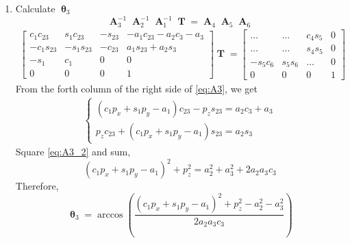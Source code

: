 \documentclass[12pt]{article}
\DeclareMathOperator{\A}{\mathbf{A}}
\DeclareMathOperator{\T}{\mathbf{T}}
\DeclareMathOperator{\Th}{\mathbf{\theta}}
\begin{document}
\begin{enumerate}
  \item Calculate $\Th_3$\\
    $$\A_3^{-1}\A_2^{-1}\A_1^{-1}\T = \A_4\A_5\A_6$$
    \begin{align} \label{eq:A3}
      \begin{bmatrix}
        c_1c_{23} & s_1c_{23} & -s_{23} & -a_1c_{23} - a_2c_3 - a_3\\
        -c_1s_{23} & -s_1s_{23} & -c_{23} & a_1s_{23} + a_2s_3\\
        -s_1 & c_1 & 0 & 0\\
        0 & 0 & 0 & 1
      \end{bmatrix}\T = 
      \begin{bmatrix}
        \dots & \dots & c_4s_5 & 0\\
        \dots & \dots & s_4s_5 & 0\\
        -s_5c_6 & s_5s_6 & \dots & 0\\
        0 & 0 & 0 & 1
      \end{bmatrix}
    \end{align}
    From the forth column of the right side of \ref{eq:A3}, we get
    \begin{align} \label{eq:A3_2}
      \begin{cases}
        (c_1p_x + s_1p_y - a_1)c_{23} - p_zs_{23} = a_2c_3 + a_3\\
        p_zc_{23} + (c_1p_x + s_1p_y - a_1)s_{23} = a_2s_3
      \end{cases}
    \end{align}
    Square \ref{eq:A3_2} and sum,
    $$(c_1p_x + s_1p_y - a_1)^2 + p_z^2 = a_2^2 + a_3^2 + 2a_2a_3c_3$$
    Therefore,
    $$\Th_3 = \arccos\left(\frac{(c_1p_x + s_1p_y - a_1)^2 + p_z^2 - a_2^2 - a_3^2}{2a_2a_3c_3}\right)$$


\end{enumerate}
\end{document}
